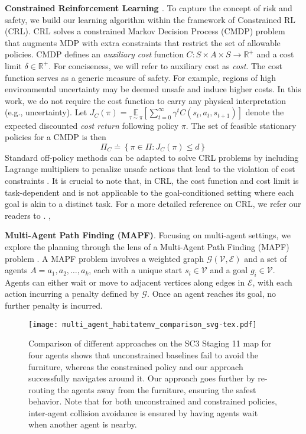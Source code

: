 \documentclass[letterpaper, 10 pt, conference]{IEEEConference}
\begin{document}
\textbf{Constrained Reinforcement Learning \label{subsec:crl}}. To capture the concept of risk and safety, we build our learning algorithm within the framework of Constrained RL (CRL). CRL solves a constrained Markov Decision Process (CMDP) \cite{altman2021constrained} problem that augments MDP with extra constraints that restrict the set of allowable policies. CMDP defines an \textit{auxiliary cost} function $C:S\times A\times S\rightarrow\mathbb{R}^+$ and a cost limit $\delta \in \mathbb{R}^+$. For conciseness, we will refer to auxiliary cost as \textit{cost}. The cost function serves as a generic measure of safety. For example, regions of high environmental uncertainty may be deemed unsafe and induce higher costs. In this work, we do not require the cost function to carry any physical interpretation (e.g., uncertainty). Let $J_{C}\left(\pi\right)=\underset{\tau\sim\pi}{\mathbb{E}}\left[\sum_{t=0}^{\infty}\gamma^{t}C\left(s_{t},a_{t},s_{t+1}\right)\right]$ denote the expected discounted \textit{cost return} following policy $\pi$. The set of feasible stationary policies for a CMDP is then
\begin{equation}
    \Pi_{C}\doteq\left\{ \pi\in\Pi:J_{C}\left(\pi\right)\le d\right\} 
\end{equation}
Standard off-policy methods can be adapted to solve CRL problems by including Lagrange multipliers to penalize unsafe actions that lead to the violation of cost constraints \cite{Ray2019}. It is crucial to note that, in CRL, the cost function and cost limit is task-dependent and is not applicable to the goal-conditioned setting where each goal is akin to a distinct task. For a more detailed reference on CRL, we refer our readers to \cite{schulman2015trust,schulman2017proximal,sutton2018reinforcement}. , 

\textbf{Multi-Agent Path Finding (MAPF)}. Focusing on multi-agent settings, we explore the planning through the lens of a Multi-Agent Path Finding (MAPF) problem \cite{mapf_benchmarks, yu2013structure}. A MAPF problem involves a weighted graph $\mathcal{G}(\mathcal{V}, \mathcal{E})$ and a set of agents $A = {a_1, a_2, \ldots, a_k}$, each with a unique start $s_i \in \mathcal{V}$ and a goal $g_i \in \mathcal{V}$. Agents can either wait or move to adjacent vertices along edges in $\mathcal{E}$, with each action incurring a penalty defined by $\mathcal{G}$. Once an agent reaches its goal, no further penalty is incurred.

\begin{figure*}[ht]
    \centering  
    \texttt{[image: multi\_agent\_habitatenv\_comparison\_svg-tex.pdf]}
    \caption{Comparison of different approaches on the SC3 Staging 11 map for four agents shows that unconstrained baselines fail to avoid the furniture, whereas the constrained policy and our approach successfully navigates around it. Our approach goes further by re-routing the agents away from the furniture, ensuring the safest behavior. Note that for both unconstrained and constrained policies, inter-agent collision avoidance is ensured by having agents wait when another agent is nearby.}
    \label{fig:habitatenv_multi_illustration}
\end{figure*}
\end{document}
